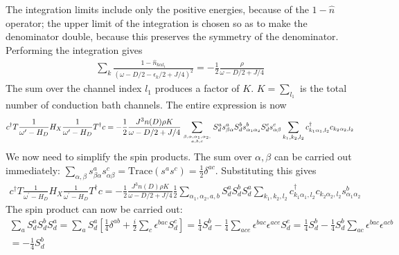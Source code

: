 \documentclass{revtex4-2}
\numberwithin{equation}{section}
\begin{document}
The integration limits include only the positive energies, because of the \(1 - \hat n\) operator; the upper limit of the integration is chosen so as to make the denominator double, because this preserves the symmetry of the denominator. Performing the integration gives
\begin{equation}\begin{aligned}
	\sum_k \frac{1 - \hat n_{k\alpha l_1}}{\left(\omega - D/2 -\epsilon_k/2 + J/4\right)^2} = -\frac{1}{2}\frac{\rho}{\omega - D/2 + J/4}
\end{aligned}\end{equation}
The sum over the channel index \(l_1\) produces a factor of \(K\). \(K = \sum_{l_1}\) is the total number of conduction bath channels. The entire expression is now
\begin{equation}\begin{aligned}
	\label{first_term}
	c^\dagger T \frac{1}{\omega^\prime - H_D} H_X \frac{1}{\omega^\prime - H_D} T^\dagger c = -\frac{1}{2}\frac{J^3 n(D) \rho K}{\omega - D/2 + J/4}\sum_{\beta, \alpha, \alpha_1,\alpha_2,\atop{a,b,c}} S_d^a s^a_{\beta \alpha} S_d^b s^b_{\alpha_1 \alpha_2} S_d^c s^c_{\alpha \beta} \sum_{k_1,k_2,l_2} c^\dagger_{k_1\alpha_1,l_2}c_{k_2 \alpha_2,l_2}
\end{aligned}\end{equation}
We now need to simplify the spin products. The sum over \(\alpha,\beta\) can be carried out immediately: \(\sum_{\alpha,\beta} s^a_{\beta \alpha} s^c_{\alpha \beta} = \text{Trace}\left(s^a s^c\right) = \frac{1}{2}\delta^{ac}\). Substituting this gives
\begin{equation}\begin{aligned}
	c^\dagger T \frac{1}{\omega^\prime - H_D} H_X \frac{1}{\omega^\prime - H_D} T^\dagger c = -\frac{1}{2}\frac{J^3 n(D) \rho K}{\omega - D/2 + J/4}\frac{1}{2}\sum_{\alpha_1,\alpha_2,a,b} S_d^a S_d^b S_d^a \sum_{k_1,k_2,l_2} c^\dagger_{k_1\alpha_1,l_2}c_{k_2 \alpha_2,l_2}s^b_{\alpha_1 \alpha_2} 
\end{aligned}\end{equation}
The spin product can now be carried out:
\begin{equation}\begin{aligned}
	\sum_a S_d^a S_d^b S_d^a = \sum_a S_d^a\left[\frac{1}{4}\delta^{ab} + \frac{i}{2}\sum_c \epsilon^{bac}S_d^c\right] = \frac{1}{4}S_d^b - \frac{1}{4}\sum_{ace}\epsilon^{bac}\epsilon^{ace}S_d^e = \frac{1}{4}S_d^b - \frac{1}{4}S_d^b \sum_{ac}\epsilon^{bac}\epsilon^{acb} \\
	= -\frac{1}{4}S_d^b
\end{aligned}\end{equation}
\end{document}
